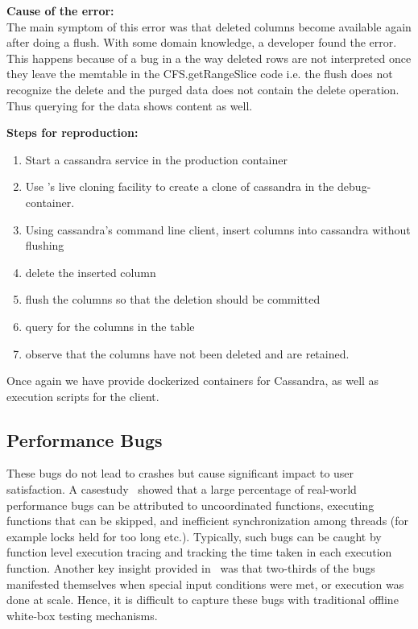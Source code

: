 \noindent \textbf{Cause of the error:} \\

The main symptom of this error was that deleted columns become available again after doing a flush.
With some domain knowledge, a developer found the error. 
This happens because of a bug in a the way deleted rows are not interpreted once they leave the memtable in the CFS.getRangeSlice code i.e. the flush does not recognize the delete and the purged data does not contain the delete operation. 
Thus querying for the data shows  content as well.

\noindent \textbf{Steps for reproduction:} \\

\begin{adjustwidth}{0.5cm}{}
	\begin{enumerate}
		\item Start a cassandra service in the production container
		\item Use \parikshan's live cloning facility to create a clone of cassandra in the debug-container.
		\item Using cassandra's command line client, insert columns into cassandra without flushing
		\item delete the inserted column
		\item flush the columns so that the deletion should be committed
		\item query for the columns in the table
		\item observe that the columns have not been deleted and are retained.
	\end{enumerate}
\end{adjustwidth}

Once again we have provide dockerized containers for Cassandra, as well as execution scripts for the client.

\subsection{Performance Bugs}

These bugs do not lead to crashes but cause significant impact to user satisfaction.
A casestudy~\cite{shanluPerf} showed that a large percentage of real-world performance bugs can be attributed to uncoordinated functions, executing functions that can be skipped, and inefficient synchronization among threads (for example locks held for too long etc.).
Typically, such bugs can be caught by function level execution tracing and tracking the time taken in each execution function.
Another key insight provided in~\cite{shanluPerf} was that two-thirds of the bugs manifested themselves when special input conditions were met, or execution was done at scale. 
Hence, it is difficult to capture these bugs with traditional offline white-box testing mechanisms.


